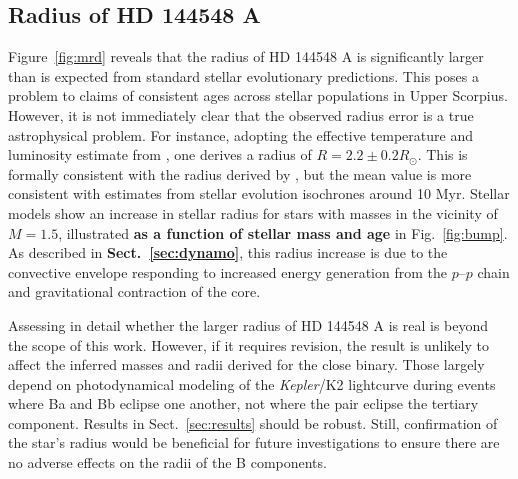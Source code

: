 \documentclass{aa}
\begin{document}
\subsection{Radius of HD 144548 A}
\label{sec:radius}
Figure~\ref{fig:mrd} reveals that the radius of HD 144548 A is significantly larger than is expected from standard stellar evolutionary predictions. This poses a problem to claims of consistent ages across stellar populations in Upper Scorpius. However, it is not immediately clear that the observed radius error is a true astrophysical problem. For instance, adopting the effective temperature and luminosity estimate from \citet{Pecaut2012}, one derives a radius of $R = 2.2 \pm 0.2 R_{\odot}$. This is formally consistent with the radius derived by \citep{Alonso2015}, but the mean value is more consistent with estimates from stellar evolution isochrones around 10 Myr. Stellar models show an increase in stellar radius for stars with masses in the vicinity of $M = 1.5$\msun, illustrated {\bf as a function of stellar mass and age} in Fig.\ \ref{fig:bump}. As described in {\bf Sect.\ \ref{sec:dynamo}}, this radius increase is due to the convective envelope responding to increased energy generation from the $p$--$p$ chain and gravitational contraction of the core.

Assessing in detail whether the larger radius of HD 144548 A is real is beyond the scope of this work. However, if it requires revision, the result is unlikely to affect the inferred masses and radii derived for the close binary. Those largely depend on photodynamical modeling of the \emph{Kepler}/K2 lightcurve during events where Ba and Bb eclipse one another, not where the pair eclipse the tertiary component. Results in Sect.~\ref{sec:results} should be robust. Still, confirmation of the star's radius would be beneficial for future investigations to ensure there are no adverse effects on the radii of the B components. 
\end{document}
